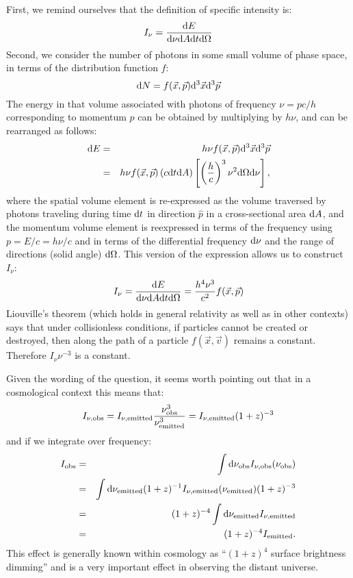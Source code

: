 \documentclass[11pt, preprint]{article}
\begin{document}
\begin{enumerate}
\begin{answer}
  First, we remind ourselves that the definition of specific intensity is:
  \begin{equation}
    I_\nu = \frac{{\rm d}E}{{\rm d}\nu {\rm d}A {\rm d}t {\rm
        d}\Omega}
  \end{equation}
  Second, we consider the number of photons in some small volume of
  phase space, in terms of the distribution function $f$:
  \begin{equation}
    {\rm d}N = f(\vec{x}, \vec{p}) {\rm d}^3 \vec{x} {\rm d}^3 \vec{p}
  \end{equation}
  The energy in that volume associated with photons of frequency $\nu
  = p c/h$ corresponding to momentum $p$ can be obtained by
  multiplying by $h\nu$, and can be rearranged as follows:
  \begin{eqnarray}
    {\rm d}E &=&
    h \nu f(\vec{x}, \vec{p}) {\rm d}^3 \vec{x} {\rm d}^3 \vec{p} \cr
    &=&
    h \nu f(\vec{x}, \vec{p}) \left(c {\rm d}t {\rm d}A\right)
     \left[ \left(\frac{h}{c}\right)^3 \nu^2 {\rm d}\Omega {\rm
         d}\nu\right],
  \end{eqnarray}
  where the spatial volume element is re-expressed as the volume
  traversed by photons traveling during time ${\rm d}t$ in direction
  $\hat{p}$ in a cross-sectional area ${\rm d}A$, and the momentum
  volume element is reexpressed in terms of the frequency using $p =
  E/c = h\nu /c$ and in terms of the differential frequency ${\rm
    d}\nu$ and the range of directions (solid angle) ${\rm d}\Omega$.
  This version of the expression allows us to construct $I_\nu$:
  \begin{equation}
    I_\nu = \frac{{\rm d}E}{{\rm d}\nu {\rm d}A {\rm d}t {\rm
        d}\Omega} = \frac{h^4 \nu^3}{c^2} f(\vec{x}, \vec{p})
  \end{equation}
  Liouville's theorem (which holds in general relativity as well as in
  other contexts) says that under collisionless conditions, if
  particles cannot be created or destroyed, then along the path of a
  particle $f(\vec{x}, \vec{v})$ remains a constant. Therefore $I_\nu
  \nu^{-3}$ is a constant.

  Given the wording of the question, it seems worth pointing out that
  in a cosmological context this means that:
  \begin{equation}
    I_{\nu, {\rm obs}} = I_{\nu, {\rm emitted}} \frac{\nu_{\rm
        obs}^3}{\nu_{\rm emitted}^3} = I_{\nu, {\rm emitted}} (1+z)^{-3}
  \end{equation}
  and if we integrate over frequency:
  \begin{eqnarray}
    I_{\rm obs}
     &=& \int {\rm d}\nu_{\rm obs} I_{\nu, {\rm obs}}(\nu_{\rm obs}) \cr
 &=& \int {\rm d}\nu_{\rm emitted} (1+z)^{-1} I_{\nu, {\rm
     emitted}}(\nu_{\rm emitted}) (1+z)^{-3} \cr
     &=& (1+z)^{-4} \int {\rm d}\nu_{\rm emitted} I_{\nu, {\rm
        emitted}} \cr
 &=& (1+z)^{-4} I_{\rm emitted}.
  \end{eqnarray}
This effect is generally known within cosmology as ``$(1+z)^4$
surface brightness dimming'' and is a very important effect in
observing the distant universe.
\end{answer}
  

\end{enumerate}
\end{document}
